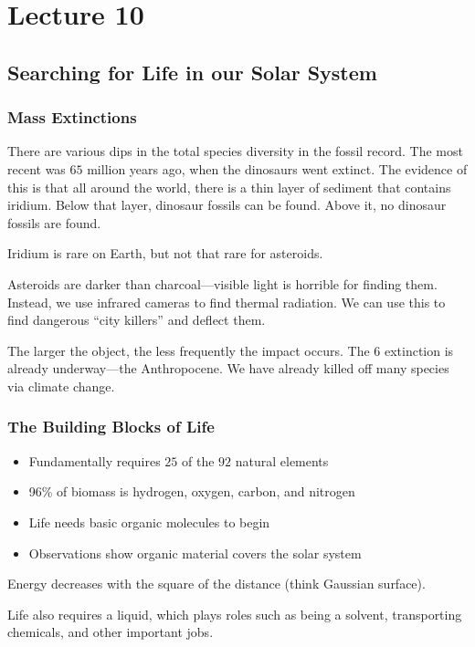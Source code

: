 \documentclass[class=article, crop=false]{standalone}
\begin{document}
  \section{Lecture 10}
  \subsection{Searching for Life in our Solar System}
  \subsubsection{Mass Extinctions}
  There are various dips in the total species diversity in the fossil record. The most recent was $65$ million years ago, when the dinosaurs went extinct. The evidence of this is that all around the world, there is a thin layer of sediment that contains iridium. Below that layer, dinosaur fossils can be found. Above it, no dinosaur fossils are found.
  \begin{note}{}
    Iridium is rare on Earth, but not that rare for asteroids.
  \end{note}
  \begin{note}{}
    Asteroids are darker than charcoal---visible light is horrible for finding them. Instead, we use infrared cameras to find thermal radiation. We can use this to find dangerous ``city killers'' and deflect them.
  \end{note}
  The larger the object, the less frequently the impact occurs. The 6 extinction is already underway---the Anthropocene. We have already killed off many species via climate change.
  \subsubsection{The Building Blocks of Life}
  \begin{itemize}
    \item Fundamentally requires $25$ of the $92$ natural elements
    \item 96\% of biomass is hydrogen, oxygen, carbon, and nitrogen
    \item Life needs basic organic molecules to begin
    \item Observations show organic material covers the solar system
  \end{itemize}
  \begin{note}{}
    Energy decreases with the square of the distance (think Gaussian surface).
  \end{note}
  Life also requires a liquid, which plays roles such as being a solvent, transporting chemicals, and other important jobs.
\end{document}
